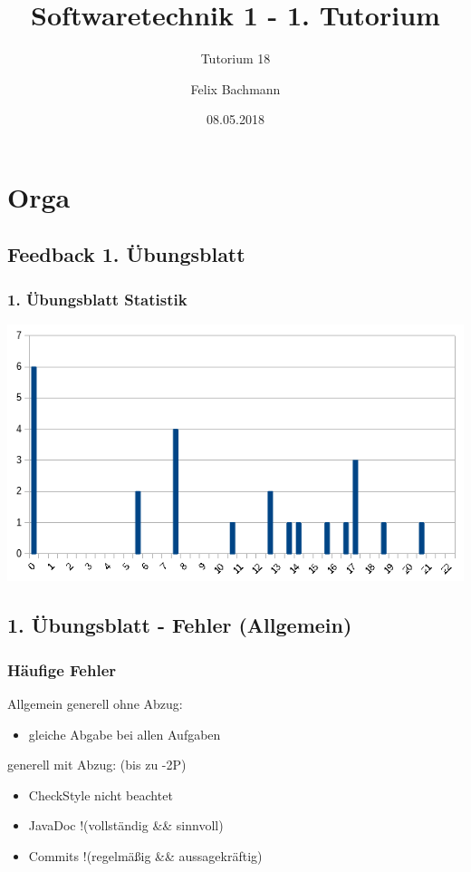 \documentclass[18pt]{beamer}
\title[SWT1]{Softwaretechnik 1 - 1. Tutorium}
\subtitle{Tutorium 18}
\author{Felix Bachmann}
\date{08.05.2018}
\institute{KIT - Institut für Programmstrukturen und Datenorganisation (IPD)}
\begin{document}

\begin{frame}
\titlepage
\end{frame}

\section{Orga}
	\subsection{Feedback 1. Übungsblatt}
	\begin{frame}
		\frametitle{1. Übungsblatt Statistik}
		\includegraphics[scale=0.7]{./pics/tut1/statistics_ub1.png}
	\end{frame}
	
	\subsection{1. Übungsblatt - Fehler (Allgemein)}
	\begin{frame}
		\frametitle{Häufige Fehler}
		\begin{block}{Allgemein}
			generell ohne Abzug:
			\begin{itemize}
				\item gleiche Abgabe bei allen Aufgaben
			\end{itemize}
			\pause
			generell mit Abzug: (bis zu -2P)
			\begin{itemize}
				\item  CheckStyle nicht beachtet
				\item JavaDoc !(vollständig \&\& sinnvoll)
				\item Commits !(regelmäßig \&\& aussagekräftig)
			\end{itemize}
		\end{block}
	\end{frame}
	
\end{document}
